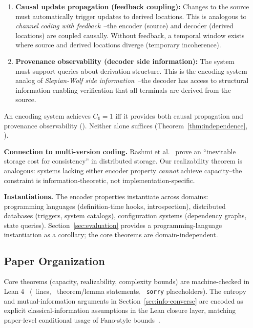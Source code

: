 \begin{enumerate}
\item \textbf{Causal update propagation (feedback coupling):} Changes to the source must automatically trigger updates to derived locations. This is analogous to \emph{channel coding with feedback}~\cite{cover2006elements}--the encoder (source) and decoder (derived locations) are coupled causally. Without feedback, a temporal window exists where source and derived locations diverge (temporary incoherence).

\item \textbf{Provenance observability (decoder side information):} The system must support queries about derivation structure. This is the encoding-system analog of \emph{Slepian-Wolf side information}~\cite{slepian1973noiseless}--the decoder has access to structural information enabling verification that all terminals are derived from the source.
\end{enumerate}

\begin{theorem}
An encoding system achieves $C_0 = 1$ iff it provides both causal propagation and provenance observability (). Neither alone suffices (Theorem~\ref{thm:independence}, ).
\end{theorem}

\textbf{Connection to multi-version coding.} Rashmi et al.~\cite{rashmi2015multiversion} prove an ``inevitable storage cost for consistency'' in distributed storage. Our realizability theorem is analogous: systems lacking either encoder property \emph{cannot} achieve capacity--the constraint is information-theoretic, not implementation-specific.

\textbf{Instantiations.} The encoder properties instantiate across domains: programming languages (definition-time hooks, introspection), distributed databases (triggers, system catalogs), configuration systems (dependency graphs, state queries). Section~\ref{sec:evaluation} provides a programming-language instantiation as a corollary; the core theorems are domain-independent.

\subsection{Paper Organization}\label{overview}

Core theorems (capacity, realizability, complexity bounds) are machine-checked in Lean 4~\cite{demoura2021lean4} (\LeanTotalLines\ lines, \LeanTotalTheorems\ theorem/lemma statements, \LeanTotalSorry\ \texttt{sorry} placeholders). The entropy and mutual-information arguments in Section~\ref{sec:info-converse} are encoded as explicit classical-information assumptions in the Lean closure layer, matching paper-level conditional usage of Fano-style bounds~\cite{cover2006elements}.

